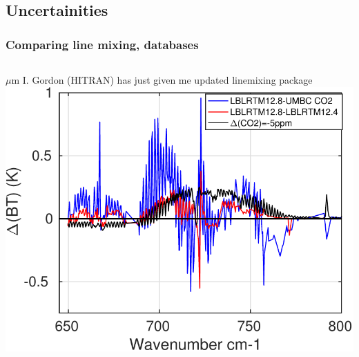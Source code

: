 \documentclass[10pt,t]{beamer}
\begin{document}
\subsection{Uncertainities}
\begin{frame}
  \frametitle{Comparing \cd line mixing, \methane databases}

  \begin{columns}

    \begin{column}{0.55\columnwidth}
      \begin{block}{\hspace{0.2in}$\mu$m}
        \small  I. Gordon (HITRAN) has just given me updated \cd linemixing package\\
        \vspace{0.2in}      
        \includegraphics[width=\linewidth]{Figs/FigsHITRAN/co2_intercompare_different_models2.pdf}
      \end{block}
    \end{column}


\end{columns}
\end{frame}
\end{document}
